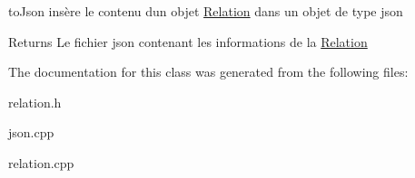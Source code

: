 to\+Json insère le contenu d\textquotesingle{}un objet \hyperlink{classRelation}{Relation} dans un objet de type json 

\begin{DoxyReturn}{Returns}
Le fichier json contenant les informations de la \hyperlink{classRelation}{Relation} 
\end{DoxyReturn}


The documentation for this class was generated from the following files\+:\begin{DoxyCompactItemize}
\item 
relation.\+h\item 
json.\+cpp\item 
relation.\+cpp\end{DoxyCompactItemize}
